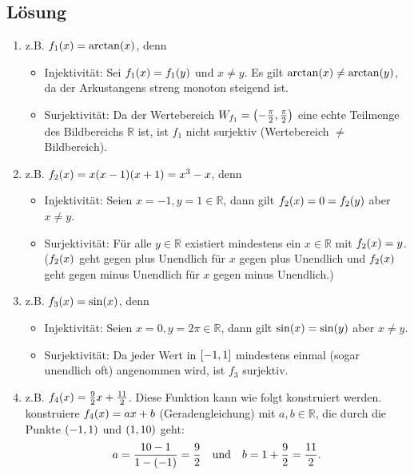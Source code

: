 \documentclass[german,12pt]{homework}
\newcommand{\RR}{\mathbb{R}}
\DeclarePairedDelimiter{\enbrace}{(}{)}
\DeclarePairedDelimiter{\benbrace}{[}{]}
\begin{document}
    \subsection*{Lösung}
    \begin{enumerate}
        \item z.B. \(f_1\enbrace*{x} = \arctan\enbrace*{x}\), denn
        \begin{itemize}
            \item Injektivität: Sei \(f_1\enbrace*{x} = f_1\enbrace*{y}\) und \(x \ne y\). Es gilt \(\arctan\enbrace*{x} \ne \arctan\enbrace*{y}\), da der Arkustangens streng monoton steigend ist.
            \item Surjektivität: Da der Wertebereich \(W_{f_1} = \enbrace*{-\frac{\pi}{2}, \frac{\pi}{2}}\) eine echte Teilmenge des Bildbereichs \(\RR\) ist, ist \(f_1\) nicht surjektiv (Wertebereich \(\ne\) Bildbereich).
        \end{itemize}
        \item z.B. \(f_2\enbrace*{x} = x\enbrace*{x - 1}\enbrace*{x + 1} = x^3 - x\), denn
        \begin{itemize}
            \item Injektivität: Seien \(x = -1, y = 1 \in \RR\), dann gilt \(f_2\enbrace*{x} = 0 = f_2\enbrace*{y}\) aber \(x \ne y\).
            \item Surjektivität: Für alle \(y \in \RR\) existiert mindestens ein \(x \in \RR\) mit \(f_2\enbrace*{x} = y\). (\(f_2\enbrace*{x}\) geht gegen plus Unendlich für \(x\) gegen plus Unendlich und \(f_2\enbrace*{x}\) geht gegen minus Unendlich für \(x\) gegen minus Unendlich.)
        \end{itemize}
        \item z.B. \(f_3\enbrace*{x} = \sin\enbrace*{x}\), denn
        \begin{itemize}
            \item Injektivität: Seien \(x = 0, y = 2\pi \in \RR\), dann gilt \(\sin\enbrace*{x} = \sin\enbrace*{y}\) aber \(x \ne y\).
            \item Surjektivität: Da jeder Wert in \(\benbrace*{-1, 1}\) mindestens einmal (sogar unendlich oft) angenommen wird, ist \(f_3\) surjektiv.
        \end{itemize}
        \item z.B. \(f_4\enbrace*{x} = \frac{9}{2}x + \frac{11}{2}\). Diese Funktion kann wie folgt konstruiert werden. konstruiere \(f_4\enbrace*{x} = ax + b\) (Geradengleichung) mit \(a, b \in \RR\), die durch die Punkte \(\enbrace*{-1, 1}\) und \(\enbrace*{1, 10}\) geht:
        \[a = \frac{10 - 1}{1 - \enbrace*{-1}} = \frac{9}{2} \quad \text{und} \quad b = 1 + \frac{9}{2} = \frac{11}{2}.\]
    \end{enumerate}
\end{document}
